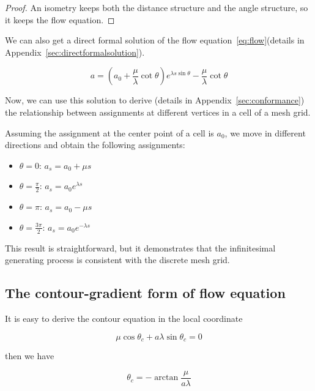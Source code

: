 \begin{proof}
  An isometry keeps both the distance structure and the angle structure, so it keeps the flow equation.
\end{proof}

We can also get a direct formal solution of the flow equation~\eqref{eq:flow}(details in Appendix~\ref{sec:directformalsolution}).

\begin{equation}
   a = (a_0 + \frac{\mu}{\lambda} \cot \theta) e^{\lambda s \sin \theta} - \frac{\mu}{\lambda} \cot \theta\label{eq:solution}
\end{equation}

Now, we can use this solution to derive (details in Appendix~\ref{sec:conformance}) the relationship between assignments at different vertices in a cell of a mesh grid.

Assuming the assignment at the center point of a cell is $a_0$, we move in different directions and obtain the following assignments:

\begin{itemize}
\item $\theta = 0$: $a_s = a_0 + \mu s$
\item $\theta = \frac{\pi}{2}$: $a_s = a_0 e^{\lambda s}$
\item $\theta = \pi$: $a_s = a_0 - \mu s$
\item $\theta = \frac{3 \pi}{2}$: $a_s = a_0 e^{- \lambda s} $
\end{itemize}

This result is straightforward, but it demonstrates that the infinitesimal generating process is consistent with the discrete mesh grid.

\subsection{The contour-gradient form of flow equation}\label{subsec:the-contour-gradient-form}

It is easy to derive the contour equation in the local coordinate

\begin{equation}
    \mu \cos \theta_c + a \lambda \sin \theta_c = 0\label{eq:contour}
\end{equation}

then we have

\begin{equation}
    \theta_c = - \arctan \frac{\mu}{a \lambda}\label{eq:contourangle}
\end{equation}


